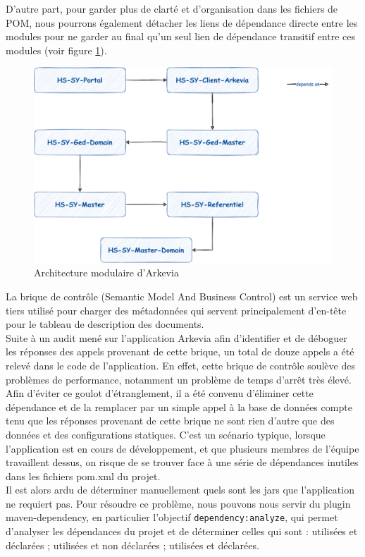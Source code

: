 D'autre part, pour garder plus de clarté et d'organisation dans les fichiers de POM, nous pourrons également détacher les liens de dépendance directe entre les modules pour ne garder au final qu'un seul lien de dépendance transitif entre ces modules (voir figure \ref{fig:modules_arkevia}).
\begin{figure}[H]
    \begin{center}
        \includegraphics[width=0.6\linewidth]{images/sec4/dep.pdf}
        \caption{Architecture modulaire d'Arkevia}
        \label{fig:modules_arkevia}
    \end{center}
\end{figure}
La brique de contrôle (Semantic Model And Business Control) est un service web tiers utilisé pour charger des métadonnées qui servent principalement d'en-tête pour le tableau de description des documents.\\
Suite à un audit mené sur l'application Arkevia afin d'identifier et de déboguer les réponses des appels provenant de cette brique, un total de douze appels a été relevé dans le code de l'application. En effet, cette brique de contrôle soulève des problèmes de performance, notamment un problème de temps d'arrêt très élevé. Afin d'éviter ce goulot d'étranglement, il a été convenu d'éliminer cette dépendance et de la remplacer par un simple appel à la base de données compte tenu que les réponses provenant de cette brique ne sont rien d'autre que des données et des configurations statiques.
C'est un scénario typique, lorsque l'application est en cours de développement, et que plusieurs membres de l'équipe travaillent dessus, on risque de se trouver face à une série de dépendances inutiles dans les fichiers pom.xml du projet.\\
Il est alors ardu de déterminer manuellement quels sont les jars que l'application ne requiert pas. Pour résoudre ce problème, nous pouvons nous servir du plugin maven-dependency, en particulier l'objectif \lstinline|dependency:analyze|, qui permet d'analyser les dépendances du projet et de déterminer celles qui sont : utilisées et déclarées ; utilisées et non déclarées ; utilisées et déclarées.
